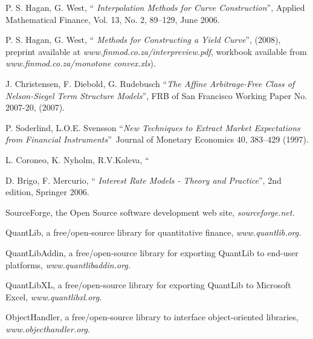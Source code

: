 \documentclass[11pt,reqno]{amsart}
\begin{document}
\begin{thebibliography}{99}
 P. S. Hagan, G. West, \textquotedblleft \textit{%
Interpolation Methods for Curve Construction}\textquotedblright , Applied
Mathematical Finance, Vol. 13, No. 2, 89--129, June 2006.

 P. S. Hagan, G. West, \textquotedblleft \textit{%
Methods for Constructing a Yield Curve}\textquotedblright , (2008), preprint
available at \textit{www.finmod.co.za/interpreview.pdf}, workbook available
from \textit{www.finmod.co.za/monotone convex.xls}).

 J. Christensen, F. Diebold, G. Rudebusch
\textquotedblleft \textit{The Affine Arbitrage-Free Class of Nelson-Siegel
Term Structure Models}\textquotedblright , FRB of San Francisco Working
Paper No. 2007-20, (2007).

 P. Soderlind, L.O.E. Svensson
\textquotedblleft \textit{New Techniques to Extract Market Expectations from
Financial Instruments}\textquotedblright\ Journal of Monetary Economics 40,
383--429 (1997).

 L. Coroneo, K. Nyholm, R.V.Koleva, \textquotedblleft 

 D. Brigo, F. Mercurio, \textquotedblleft \textit{%
Interest Rate Models - Theory and Practice}\textquotedblright , 2nd edition,
Springer 2006.

 SourceForge, the Open Source software development web
site, \textit{sourceforge.net.}

 QuantLib, a free/open-source library for quantitative
finance, \textit{www.quantlib.org.}

 QuantLibAddin, a free/open-source library for
exporting QuantLib to end-user platforms, \textit{www.quantlibaddin.org.}

 QuantLibXL, a free/open-source library for exporting
QuantLib to Microsoft Excel, \textit{www.quantlibxl.org.}

 ObjectHandler, a free/open-source library to
interface object-oriented libraries, \textit{www.objecthandler.org.}
\end{thebibliography}
\end{document}
